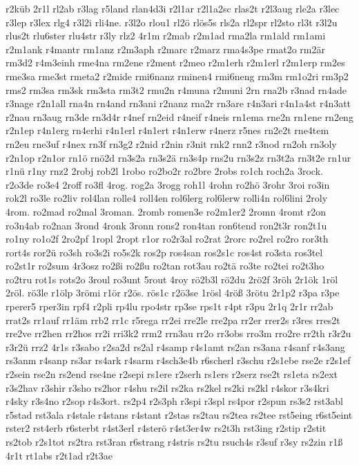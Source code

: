 {r2küb
2r1l
rl2ab
r3lag
r5land
rlan4d3i
r2l1ar
r2l1a2sc
rlas2t
r2l3aug
rle2a
r3lec
r3lep
r3lex
rlg4
r3l2i
rli4ne.
r3l2o
rlou1
rl2ö
rlös5s
rls2a
rl2spr
rl2sto
rl3t
r3l2u
rlus2t
rlu6ster
rlu4str
r3ly
rlz2
4r1m
r2mab
r2m1ad
rma2la
rm1ald
rm1ami
r2m1ank
r4mantr
rm1anz
r2m3aph
r2marc
r2marz
rma4s3pe
rmat2o
rm2är
rm3d2
r4m3einh
rme4na
rm2ene
r2ment
r2meo
r2m1erh
r2m1erl
r2m1erp
rm2es
rme3sa
rme3st
rmeta2
r2mide
rmi6nanz
rminen4
rmi6neng
rm3m
rm1o2ri
rm3p2
rms2
rm3sa
rm3sk
rm3sta
rm3t2
rmu2n
r4muna
r2muni
2rn
rna2b
r3nad
rn4ade
r3nage
r2n1all
rna4n
rn4and
rn3ani
r2nanz
rna2r
rn3are
r4n3ari
r4n1a4st
r4n3att
r2nau
rn3aug
rn3de
rn3d4r
r4nef
rn2eid
r4neif
r4neis
rn1ema
rne2n
rn1ene
rn2eng
r2n1ep
r4n1erg
rn4erhi
r4n1erl
r4n1ert
r4n1erw
r4nerz
r5nes
rn2e2t
rne4tem
rn2eu
rne3uf
r4nex
rn3f
rn3g2
r2nid
r2nin
r3nit
rnk2
rnn2
r3nod
rn2oh
rn3oly
r2n1op
r2n1or
rn1ö
rnö2d
rn3s2a
rn3s2ä
rn3s4p
rns2u
rn3s2z
rn3t2a
rn3t2e
rn1ur
r1nü
r1ny
rnz2
2robj
rob2l
1robo
ro2bo2r
ro2bre
2robs
ro1ch
roch2a
3rock.
r2o3de
ro3e4
2roff
ro3fl
4rog.
rog2a
3rogg
roh1l
4rohn
ro2hö
3rohr
3roi
ro3in
rok2l
ro3le
ro2liv
rol4lan
rolle4
roll4en
rol6lerg
rol6lerw
rolli4n
rol6lini
2roly
4rom.
ro2mad
ro2mal
3roman.
2romb
romen3e
ro2m1er2
2romn
4romt
r2on
ro3n4ab
ro2nan
3rond
4ronk
3ronn
rons2
ron4tan
ron6tend
ron2t3r
ron2t1u
ro1ny
ro1o2f
2ro2pf
1ropl
2ropt
r1or
ro2r3al
ro2rat
2rorc
ro2rel
ro2ro
ror3th
rort4s
ror2ü
ro3sh
ro3s2i
ro5s2k
ros2p
ros4san
ros2s1c
ros4st
ro3sta
ros3tel
ro2st1r
ro2sum
4r3osz
ro2ßi
ro2ßu
ro2tan
rot3au
ro2tä
ro3te
ro2tei
ro2t3ho
ro2tru
rot1s
rots2o
3roul
ro3unt
5rout
4roy
rö2b3l
rö2du
2rö2f
3röh
2r1ök
1röl
2röl.
rö3le
r1ölp
3römi
r1ör
r2ös.
rös1c
r2ö3se
1rösl
4röß
3rötu
2r1p2
r3pa
r3pe
rperer5
rper3in
rpf4
r2pli
rp4lu
rpo4str
rp3se
rps1t
r4pt
r3pu
2r1q
2r1r
rr2ab
rrat2s
rr1auf
rr1äm
rrb2
rr1c
r5rega
rr2ei
rre2le
rre2pa
rr2er
rrer2s
r3res
rres2t
rre2ve
rr2hen
rr2hos
rr2i
rri3k2
rrm2
rrn3au
rr2o
rr3obs
rro3m
rro2re
rr2th
r3r2u
r3r2ü
rrz2
4r1s
r3sabo
r2sa2d
rs2al
r4samp
r4s1amt
rs2an
rs3ana
r4sanf
r4s3ang
rs3anm
r4sanp
rs3ar
rs4ark
r4sarm
r4sch3e4b
r6scherl
r3schu
r2s1ebe
rse2e
r2s1ef
r2sein
rse2n
rs2end
rse4ne
r2sepi
rs1ere
r2serh
rs1ers
r2serz
rse2t
rs1eta
rs2ext
r3s2hav
r3shir
r3sho
rs2hor
r4shu
rs2il
rs2ka
rs2kel
rs2ki
rs2kl
r4skor
r3s4kri
r4sky
r3s4no
r2sop
r4s3ort.
rs2p4
r2s3ph
r3spi
r3spl
rs4por
r2spun
rs3s2
rst3abl
r5stad
rst3ala
r4stale
r4stans
r4stant
r2stas
rs2tau
rs2tea
rs2tee
rst5eing
r6st5eint
rster2
rst4erb
r6sterbt
r4st3erl
r4sterö
r4st3er4w
rs2t3h
rst3ing
r2stip
r2stit
rs2tob
r2s1tot
rs2tra
rst3ran
r6strang
r4stris
rs2tu
rsuch4s
r3suf
r3sy
rs2zin
r1ß
4r1t
rt1abs
r2t1ad
r2t3ae
}
